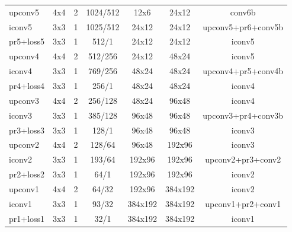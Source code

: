 \begin{table}[htbp]
\begin{scriptsize}
\begin{tabular}{|l|c c c|c c|c|}
			upconv5    & 4x4 & 2 & 1024/512  & 12x6        & 24x12    & conv6b \\
			iconv5        & 3x3 & 1 & 1025/512  & 24x12      & 24x12    & upconv5+pr6+conv5b \\
			pr5+loss5  & 3x3 & 1 & 512/1         & 24x12      & 24x12    & iconv5 \\
			upconv4    & 4x4 & 2 & 512/256   & 24x12      & 48x24    & iconv5 \\
			iconv4        & 3x3 & 1 & 769/256  & 48x24     & 48x24    & upconv4+pr5+conv4b \\
			pr4+loss4 & 3x3 & 1  & 256/1       & 48x24     & 48x24    & iconv4 \\
			upconv3    & 4x4 & 2 & 256/128  & 48x24     & 96x48    & iconv4 \\
			iconv3        & 3x3 & 1 & 385/128  & 96x48    & 96x48    & upconv3+pr4+conv3b \\
			pr3+loss3 & 3x3 & 1 & 128/1        & 96x48    & 96x48    & iconv3 \\
			upconv2    & 4x4 & 2 & 128/64    & 96x48    & 192x96   & iconv3 \\
			iconv2        & 3x3 & 1 & 193/64   & 192x96   & 192x96   & upconv2+pr3+conv2 \\
			pr2+loss2  & 3x3 & 1 & 64/1        & 192x96   & 192x96    & iconv2 \\
			upconv1     & 4x4 & 2 & 64/32    & 192x96    & 384x192 & iconv2 \\
			iconv1        & 3x3 & 1 & 93/32     &384x192  & 384x192 & upconv1+pr2+conv1 \\
			pr1+loss1  & 3x3 & 1 & 32/1         & 384x192 & 384x192 & iconv1 \\\hline
		\end{tabular}
    \end{scriptsize}
\end{table}

